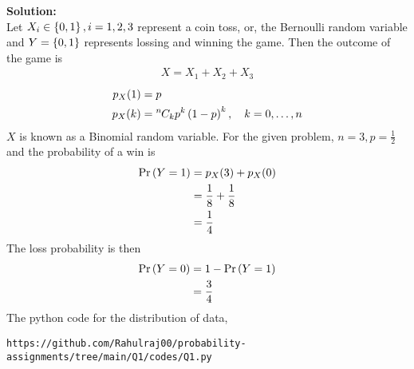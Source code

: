 \documentclass{article}
\newcommand*{\permcomb}[4][0mu]{{{}^{#3}\mkern#1#2_{#4}}}
\newcommand*{\comb}[1][-1mu]{\permcomb[#1]{C}}
\newcommand{\solution}{\noindent \textbf{Solution: }}
\begin{document}
\solution\\
Let $X_i\in \left\{0,1\right\}, i = 1, 2, 3$ represent a coin toss, or, the Bernoulli random variable and $Y=\left\{0,1\right\}$ represents lossing and winning the game. Then the outcome of the game is
\begin{align}
X = X_1+X_2+X_3	
\end{align}
\begin{align}
p_X(1) &= p\\
p_X(k) &= \comb{n}{k}p^k\brak{1-p}^k, \quad k = 0,\dots, n
\end{align}
$X$ is known as a Binomial random variable.  For the given problem, $n = 3, p = \frac{1}{2}$ and the probability of a win is
\begin{align}
\Pr\left(Y=1\right)&=p_X(3) + p_X(0) \\
&= \frac{1}{8}+\frac{1}{8}\\
&= \frac{1}{4}
\end{align}
The loss probability is then
\begin{align}
\Pr\left(Y=0\right)&= 1- \Pr\left(Y=1\right) \\
&= \frac{3}{4}
\end{align}
The python code for the distribution of data,\\
\begin{lstlisting}
https://github.com/Rahulraj00/probability-assignments/tree/main/Q1/codes/Q1.py 
\end{lstlisting}   	
\end{document}
